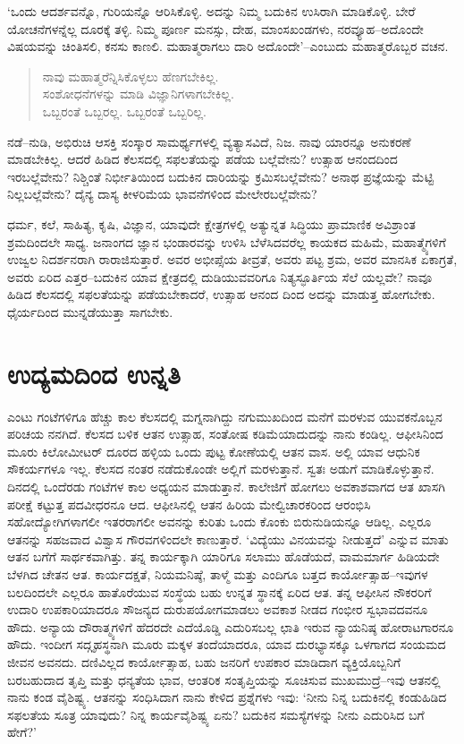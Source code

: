 ‘ಒಂದು ಆದರ್ಶವನ್ನೊ, ಗುರಿಯನ್ನೊ ಆರಿಸಿಕೊಳ್ಳಿ. ಅದನ್ನು ನಿಮ್ಮ ಬದುಕಿನ ಉಸಿರಾಗಿ ಮಾಡಿಕೊಳ್ಳಿ. ಬೇರೆ ಯೋಚನೆಗಳನ್ನೆಲ್ಲ ದೂರಕ್ಕೆ ತಳ್ಳಿ. ನಿಮ್ಮ ಪೂರ್ಣ ಮನಸ್ಸು, ದೇಹ, ಮಾಂಸಖಂಡಗಳು, ನರವ್ಯೂಹ–ಅದೊಂದೇ ವಿಷಯವನ್ನು ಚಿಂತಿಸಲಿ, ಕನಸು ಕಾಣಲಿ. ಮಹಾತ್ಮರಾಗಲು ದಾರಿ ಅದೊಂದೇ’–ಎಂಬುದು ಮಹಾತ್ಮರೊಬ್ಬರ ವಚನ.

\begin{verse}
ನಾವು ಮಹಾತ್ಮರೆನ್ನಿಸಿಕೊಳ್ಳಲು ಹೆಣಗಬೇಕಿಲ್ಲ.\\ಸಂಶೋಧನೆಗಳನ್ನು ಮಾಡಿ ವಿಜ್ಞಾನಿಗಳಾಗಬೇಕಿಲ್ಲ.\\ಒಬ್ಬರಂತೆ ಒಬ್ಬರಲ್ಲ. ಒಬ್ಬರಂತೆ ಒಬ್ಬರಿಲ್ಲ.
\end{verse}

ನಡೆ–ನುಡಿ, ಅಭಿರುಚಿ ಆಸಕ್ತಿ ಸಂಸ್ಕಾರ ಸಾಮರ್ಥ್ಯಗಳಲ್ಲಿ ವ್ಯತ್ಯಾಸವಿದೆ, ನಿಜ. ನಾವು ಯಾರನ್ನೂ ಅನುಕರಣೆ ಮಾಡಬೇಕಿಲ್ಲ. ಆದರೆ ಹಿಡಿದ ಕೆಲಸದಲ್ಲಿ ಸಫಲತೆಯನ್ನು ಪಡೆಯ ಬಲ್ಲೆವೇನು? ಉತ್ಸಾಹ ಆನಂದದಿಂದ ಇರಬಲ್ಲೆವೇನು? ನಿಶ್ಚಿಂತೆ ನಿರ್ಭೀತಿಯಿಂದ ಬದುಕಿನ ದಾರಿಯನ್ನು ಕ್ರಮಿಸಬಲ್ಲೆವೇನು? ಅನಾಥ ಪ್ರಜ್ಞೆಯನ್ನು ಮೆಟ್ಟಿ ನಿಲ್ಲಬಲ್ಲೆವೇನು? ದೈನ್ಯ ದಾಸ್ಯ ಕೀಳರಿಮೆಯ ಭಾವನೆಗಳಿಂದ ಮೇಲೇರಬಲ್ಲೆವೇನು?

ಧರ್ಮ, ಕಲೆ, ಸಾಹಿತ್ಯ, ಕೃಷಿ, ವಿಜ್ಞಾನ, ಯಾವುದೇ ಕ್ಷೇತ್ರಗಳಲ್ಲಿ ಅತ್ಯುನ್ನತ ಸಿದ್ಧಿಯು ಪ್ರಾಮಾಣಿಕ ಅವಿಶ್ರಾಂತ ಶ್ರಮದಿಂದಲೇ ಸಾಧ್ಯ. ಜನಾಂಗದ ಜ್ಞಾನ ಭಂಡಾರವನ್ನು ಉಳಿಸಿ ಬೆಳೆಸಿದವರೆಲ್ಲ ಕಾಯಕದ ಮಹಿಮೆ, ಮಹಾತ್ಮ್ಯೆಗಳಿಗೆ ಉಜ್ವಲ ನಿದರ್ಶನರಾಗಿ ರಾರಾಜಿಸು\-ತ್ತಾರೆ. ಅವರ ಅಭೀಪ್ಸೆಯ ತೀವ್ರತೆ, ಅವರು ಪಟ್ಟ ಶ್ರಮ, ಅವರ ಮಾನಸಿಕ ಏಕಾಗ್ರತೆ, ಅವರು ಏರಿದ ಎತ್ತರ–ಬದುಕಿನ ಯಾವ ಕ್ಷೇತ್ರದಲ್ಲಿ ದುಡಿಯುವವರಿಗೂ ನಿತ್ಯಸ್ಫೂರ್ತಿಯ ಸೆಲೆ ಯಲ್ಲವೇ? ನಾವೂ ಹಿಡಿದ ಕೆಲಸದಲ್ಲಿ ಸಫಲತೆಯನ್ನು ಪಡೆಯಬೇಕಾದರೆ, ಉತ್ಸಾಹ ಆನಂದ ದಿಂದ ಅದನ್ನು ಮಾಡುತ್ತ ಹೋಗಬೇಕು. ಧೈರ್ಯದಿಂದ ಮುನ್ನಡೆಯುತ್ತಾ ಸಾಗಬೇಕು.


\section*{ಉದ್ಯಮದಿಂದ ಉನ್ನತಿ}


ಎಂಟು ಗಂಟೆಗಳಿಗೂ ಹೆಚ್ಚು ಕಾಲ ಕೆಲಸದಲ್ಲಿ ಮಗ್ನನಾಗಿದ್ದು ನಗುಮುಖದಿಂದ ಮನೆಗೆ ಮರಳುವ ಯುವಕನೊಬ್ಬನ ಪರಿಚಯ ನನಗಿದೆ. ಕೆಲಸದ ಬಳಿಕ ಆತನ ಉತ್ಸಾಹ, ಸಂತೋಷ ಕಡಿಮೆ\-ಯಾದು\-ದನ್ನು ನಾನು ಕಂಡಿಲ್ಲ. ಆಫೀಸಿನಿಂದ ಮೂರು ಕಿಲೋಮೀಟರ್ ದೂರದ ಹಳ್ಳಿಯ ಒಂದು ಪುಟ್ಟ ಕೋಣೆಯಲ್ಲಿ ಆತನ ವಾಸ. ಅಲ್ಲಿ ಯಾವ ಆಧುನಿಕ ಸೌಕರ್ಯಗಳೂ ಇಲ್ಲ. ಕೆಲಸದ ನಂತರ ನಡೆದುಕೊಂಡೇ ಅಲ್ಲಿಗೆ ಮರಳುತ್ತಾನೆ. ಸ್ವತಃ ಅಡುಗೆ ಮಾಡಿಕೊಳ್ಳುತ್ತಾನೆ. ದಿನದಲ್ಲಿ ಒಂದೆರಡು ಗಂಟೆಗಳ ಕಾಲ ಅಧ್ಯಯನ ಮಾಡುತ್ತಾನೆ. ಕಾಲೇಜಿಗೆ ಹೋಗಲು ಅವಕಾಶವಾಗದ ಆತ ಖಾಸಗಿ ಪರೀಕ್ಷೆ ಕಟ್ಟುತ್ತ ಪದವೀಧರನೂ ಆದ. ಆಫೀಸಿನಲ್ಲಿ ಆತನ ಹಿರಿಯ ಮೇಲ್ವಿಚಾರಕರಿಂದ ಆರಂಭಿಸಿ ಸಹೋದ್ಯೋಗಿಗಳಾಗಲೀ ಇತರರಾಗಲೀ ಅವನನ್ನು ಕುರಿತು ಒಂದು ಕೊಂಕು ಬಿರುನುಡಿಯನ್ನೂ ಆಡಿಲ್ಲ. ಎಲ್ಲರೂ ಆತನನ್ನು ಸಹಜವಾದ ವಿಶ್ವಾಸ ಗೌರವಗಳಿಂದಲೇ ಕಾಣುತ್ತಾರೆ. ‘ವಿದ್ಯೆಯು ವಿನಯವನ್ನು ನೀಡುತ್ತದೆ’ ಎನ್ನುವ ಮಾತು ಆತನ ಬಗೆಗೆ ಸಾರ್ಥಕವಾಗಿತ್ತು. ತನ್ನ ಕಾರ್ಯಕ್ಕಾಗಿ ಯಾರಿಗೂ ಸಲಾಮು ಹೊಡೆಯದೆ, ವಾಮಮಾರ್ಗ ಹಿಡಿಯದೇ ಬೆಳಗಿದ ಚೇತನ ಆತ. ಕಾರ್ಯದಕ್ಷತೆ, ನಿಯಮನಿಷ್ಠೆ, ತಾಳ್ಮೆ ಮತ್ತು ಎಂದಿಗೂ ಬತ್ತದ ಕಾರ್ಯೋತ್ಸಾಹ–ಇವುಗಳ ಬಲದಿಂದಲೇ ಎಲ್ಲರೂ ಹಾತೊರೆಯುವ ಸಂಸ್ಥೆಯ ಬಹು ಉನ್ನತ ಸ್ಥಾನಕ್ಕೆ ಏರಿದ ಆತ. ತನ್ನ ಆಫೀಸಿನ ನೌಕರರಿಗೆ ಉದಾರಿ ಉಪಕಾರಿಯಾದರೂ ಸೌಜನ್ಯದ ದುರುಪಯೋಗಮಾಡಲು ಅವಕಾಶ ನೀಡದ ಗಂಭೀರ ಸ್ವಭಾವದವನೂ ಹೌದು. ಅನ್ಯಾಯ ದೌರಾತ್ಮ್ಯಗಳಿಗೆ ಹೆದರದೇ ಎದೆಯೊಡ್ಡಿ ಎದುರಿಸಬಲ್ಲ ಛಾತಿ ಇರುವ ನ್ಯಾಯನಿಷ್ಠ ಹೋರಾಟಗಾರನೂ ಹೌದು. ಇಂದೀಗ ಸದ್ಗೃಹಸ್ಥನಾಗಿ ಮೂರು ಮಕ್ಕಳ ತಂದೆಯಾದರೂ, ಯಾವ ದುರಭ್ಯಾಸಕ್ಕೂ ಒಳಗಾಗದ ಸಂಯಮದ ಜೀವನ ಅವನದು. ದಣಿವಿಲ್ಲದ ಕಾರ್ಯೋತ್ಸಾಹ, ಬಹು ಜನರಿಗೆ ಉಪಕಾರ ಮಾಡಿದಾಗ ವ್ಯಕ್ತಿಯೊಬ್ಬನಿಗೆ ಬರಬಹುದಾದ ತೃಪ್ತಿ ಮತ್ತು ಧನ್ಯತೆಯ ಭಾವ, ಆಂತರಿಕ ಸಂತೃಪ್ತಿಯನ್ನು ಸೂಚಿಸುವ ಮುಖಮುದ್ರೆ–ಇವು ಆತನಲ್ಲಿ ನಾನು ಕಂಡ ವೈಶಿಷ್ಟ್ಯ. ಆತನನ್ನು ಸಂಧಿಸಿದಾಗ ನಾನು ಕೇಳಿದ ಪ್ರಶ್ನೆಗಳು ಇವು: ‘ನೀನು ನಿನ್ನ ಬದುಕಿನಲ್ಲಿ ಕಂಡುಹಿಡಿದ ಸಫಲತೆಯ ಸೂತ್ರ ಯಾವುದು? ನಿನ್ನ ಕಾರ್ಯವೈಶಿಷ್ಟ್ಯ ಏನು? ಬದುಕಿನ ಸಮಸ್ಯೆಗಳನ್ನು ನೀನು ಎದುರಿಸಿದ ಬಗೆ ಹೇಗೆ?’

